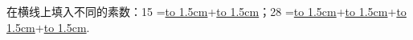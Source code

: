 在横线上填入不同的素数：15 =\underline{\hbox to 1.5cm{}}+\underline{\hbox to 1.5cm{}}；28 =\underline{\hbox to 1.5cm{}}+\underline{\hbox to 1.5cm{}}+\underline{\hbox to 1.5cm{}}+\underline{\hbox to 1.5cm{}}.